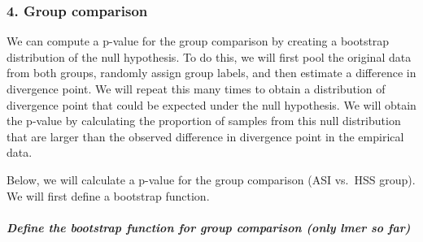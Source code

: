 \documentclass[
]{article}
\begin{document}
\subsubsection{4. Group comparison}\label{group-comparison}

We can compute a p-value for the group comparison by creating a
bootstrap distribution of the null hypothesis. To do this, we will first
pool the original data from both groups, randomly assign group labels,
and then estimate a difference in divergence point. We will repeat this
many times to obtain a distribution of divergence point that could be
expected under the null hypothesis. We will obtain the p-value by
calculating the proportion of samples from this null distribution that
are larger than the observed difference in divergence point in the
empirical data.

Below, we will calculate a p-value for the group comparison (ASI vs.~HSS
group). We will first define a bootstrap function.

\subparagraph{Define the bootstrap function for group comparison (only
lmer so
far)}\label{define-the-bootstrap-function-for-group-comparison-only-lmer-so-far}
\end{document}
